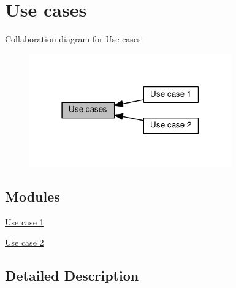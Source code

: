 \hypertarget{group__usecase}{}\section{Use cases}
\label{group__usecase}
Collaboration diagram for Use cases\+:
\nopagebreak
\begin{figure}[H]
\begin{center}
\leavevmode
\includegraphics[width=247pt]{group__usecase}
\end{center}
\end{figure}
\subsection*{Modules}
\begin{DoxyCompactItemize}
\item 
\hyperlink{group__usecase1}{Use case 1}
\item 
\hyperlink{group__usecase2}{Use case 2}
\end{DoxyCompactItemize}


\subsection{Detailed Description}



